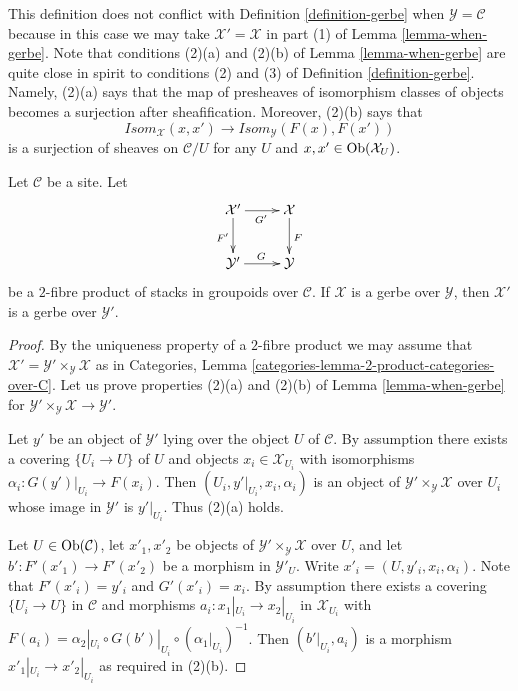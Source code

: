\noindent
This definition does not conflict with
Definition \ref{definition-gerbe}
when $\mathcal{Y} = \mathcal{C}$ because in this case we may take
$\mathcal{X}' = \mathcal{X}$ in part (1) of
Lemma \ref{lemma-when-gerbe}.
Note that conditions (2)(a) and (2)(b) of
Lemma \ref{lemma-when-gerbe}
are quite close in spirit to conditions (2) and (3) of
Definition \ref{definition-gerbe}.
Namely, (2)(a) says that the map of presheaves of isomorphism
classes of objects becomes a surjection after sheafification.
Moreover, (2)(b) says that
$$
\mathit{Isom}_\mathcal{X}(x, x')
\longrightarrow
\mathit{Isom}_\mathcal{Y}(F(x), F(x'))
$$
is a surjection of sheaves on $\mathcal{C}/U$ for any $U$ and
$x, x' \in \mathop{\mathrm{Ob}}\nolimits(\mathcal{X}_U)$.

\begin{lemma}
\label{lemma-base-change-gerbe}
Let $\mathcal{C}$ be a site. Let
$$
\xymatrix{
\mathcal{X}' \ar[r]_{G'} \ar[d]_{F'} & \mathcal{X} \ar[d]^F \\
\mathcal{Y}' \ar[r]^G & \mathcal{Y}
}
$$
be a $2$-fibre product of stacks in groupoids over $\mathcal{C}$.
If $\mathcal{X}$ is a gerbe over $\mathcal{Y}$, then
$\mathcal{X}'$ is a gerbe over $\mathcal{Y}'$.
\end{lemma}

\begin{proof}
By the uniqueness property of a $2$-fibre product we may assume that
$\mathcal{X}' = \mathcal{Y}' \times_\mathcal{Y} \mathcal{X}$
as in
Categories, Lemma \ref{categories-lemma-2-product-categories-over-C}.
Let us prove properties (2)(a) and (2)(b) of
Lemma \ref{lemma-when-gerbe}
for $\mathcal{Y}' \times_\mathcal{Y} \mathcal{X} \to \mathcal{Y}'$.

\medskip\noindent
Let $y'$ be an object of $\mathcal{Y}'$ lying over the object $U$
of $\mathcal{C}$. By assumption there exists
a covering $\{U_i \to U\}$ of $U$ and objects
$x_i \in \mathcal{X}_{U_i}$ with isomorphisms
$\alpha_i : G(y')|_{U_i} \to F(x_i)$.
Then $(U_i, y'|_{U_i}, x_i, \alpha_i)$ is an object of
$\mathcal{Y}' \times_\mathcal{Y} \mathcal{X}$ over $U_i$
whose image in $\mathcal{Y}'$ is $y'|_{U_i}$. Thus (2)(a) holds.

\medskip\noindent
Let $U \in \mathop{\mathrm{Ob}}\nolimits(\mathcal{C})$, let $x'_1, x'_2$ be objects of
$\mathcal{Y}' \times_\mathcal{Y} \mathcal{X}$ over $U$, and let
$b' : F'(x'_1) \to F'(x'_2)$ be a morphism in $\mathcal{Y}'_U$.
Write $x'_i = (U, y'_i, x_i, \alpha_i)$. Note that $F'(x'_i) = y'_i$
and $G'(x'_i) = x_i$. By assumption there exists
a covering $\{U_i \to U\}$ in $\mathcal{C}$ and morphisms
$a_i : x_1|_{U_i} \to x_2|_{U_i}$ in $\mathcal{X}_{U_i}$ with
$F(a_i) = \alpha_2|_{U_i} \circ G(b')|_{U_i} \circ
(\alpha_1|_{U_i})^{-1}$. Then $(b'|_{U_i}, a_i)$ is a morphism
$x'_1|_{U_i} \to x'_2|_{U_i}$ as required in (2)(b).
\end{proof}


